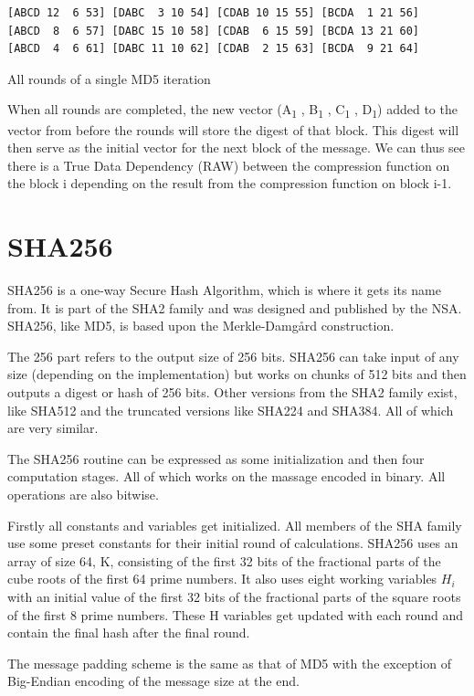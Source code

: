 \documentclass[a4paper, openany]{memoir}
\begin{document}
\begin{abstact}
\begin{table}[H]
\begin{BVerbatim}[fontsize=\tiny]
[ABCD 12  6 53] [DABC  3 10 54] [CDAB 10 15 55] [BCDA  1 21 56]
[ABCD  8  6 57] [DABC 15 10 58] [CDAB  6 15 59] [BCDA 13 21 60]
[ABCD  4  6 61] [DABC 11 10 62] [CDAB  2 15 63] [BCDA  9 21 64]
\end{BVerbatim}
\caption{All rounds of a single MD5 iteration}
\label{fig:MD5Rounds}
\end{table}
When all rounds are completed, the new vector (A\textsubscript{1} , B\textsubscript{1} , C\textsubscript{1} , D\textsubscript{1}) added to the vector from before the rounds will store the digest of that block. This digest will then serve as the initial vector for the next block of the message. We can thus see there is a True Data Dependency (RAW) between the compression function on the block i depending on the result from the compression function on block i-1.
\section{SHA256}
\label{SHAalg}
SHA256 is a one-way Secure Hash Algorithm, which is where it gets its name from.
It is part of the SHA2 family and was designed and published by the NSA.
SHA256, like MD5, is based upon the Merkle-Damgård construction.

The 256 part refers to the output size of 256 bits.
SHA256 can take input of any size (depending on the implementation) but works
on chunks of 512 bits and then outputs a digest or hash of 256 bits.
Other versions from the SHA2 family exist, like SHA512 and the truncated
versions like SHA224 and SHA384. All of which are very similar.

The SHA256 routine can be expressed as some initialization and then four computation stages.
All of which works on the massage encoded in binary. All operations are also bitwise.

Firstly all constants and variables get initialized. All members of the SHA family use some preset constants for their initial round of calculations.
SHA256 uses an array of size 64, K, consisting of the first 32 bits of the fractional parts of the cube roots of the first 64 prime numbers.
It also uses eight working variables \(H_i\) with an initial value of the first 32 bits of the fractional parts of the square roots of the first 8 prime numbers.
These H variables get updated with each round and contain the final hash after the final round.

The message padding scheme is the same as that of MD5 with the exception of Big-Endian encoding of the message size at the end.


\end{abstact}
\end{document}
